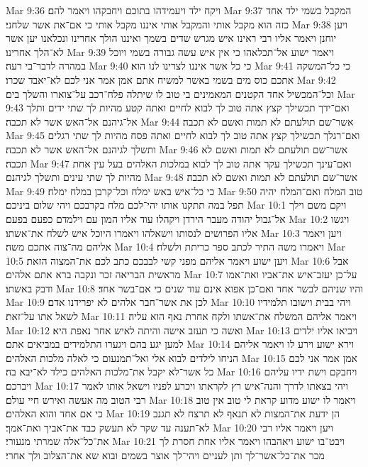 Mar 9:36  ויקח ילד ויעמידהו בתוכם ויחבקהו ויאמר להם׃
Mar 9:37  המקבל בשמי ילד אחד כזה הוא מקבל אותי והמקבל אותי איננו מקבל אותי כי אם־את אשר שלחני׃
Mar 9:38  ויען יוחנן ויאמר אליו רבי ראינו איש מגרש שדים בשמך ואיננו הולך אחרינו ונכלאנו יען אשר לא־הלך אחרינו׃
Mar 9:39  ויאמר ישוע אל־תכלאהו כי אין איש עשה גבורה בשמי ויוכל במהרה לדבר־בי רעה׃
Mar 9:40  כי כל אשר איננו לצרינו לנו הוא׃
Mar 9:41  כי כל־המשקה אתכם כוס מים בשמי באשר למשיח אתם אמן אמר אני לכם לא־יאבד שכרו׃
Mar 9:42  וכל־המכשיל אחד הקטנים המאמינים בי טוב לו שיתלה פלח־רכב על־צוארו והשלך בים׃
Mar 9:43  ואם־ידך תכשילך קצץ אתה טוב לך לבוא לחיים ואתה קטע מהיות לך שתי ידים ותלך אל־גיהנם אל־האש אשר לא תכבה׃
Mar 9:44  אשר־שם תולעתם לא תמות ואשם לא תכבה׃
Mar 9:45  ואם־רגלך תכשילך קצץ אתה טוב לך לבוא לחיים ואתה פסח מהיות לך שתי רגלים ותשלך לגיהנם אל־האש אשר לא תכבה׃
Mar 9:46  אשר־שם תולעתם לא תמות ואשם לא תכבה׃
Mar 9:47  ואם־עינך תכשילך עקר אתה טוב לך לבוא במלכות האלהים בעל עין אחת מהיות לך שתי עינים ותשלך לגיהנם׃
Mar 9:48  אשר־שם תולעתם לא תמות ואשם לא תכבה׃
Mar 9:49  כי כל־איש באש ימלח וכל־קרבן במלח ימלח׃
Mar 9:50  טוב המלח ואם־המלח יהיה תפל במה תתקנו אותו יהי־לכם מלח בקרבכם ויהי שלום ביניכם׃
Mar 10:1  ויקם משם וילך אל־גבול יהודה מעבר הירדן ויקהלו עוד אליו המון עם וילמדם כפעם בפעם׃
Mar 10:2  ויגשו אליו הפרושים לנסותו וישאלהו ויאמרו היוכל איש לשלח את־אשתו׃
Mar 10:3  ויען ויאמר אליהם מה־צוה אתכם משה׃
Mar 10:4  ויאמרו משה התיר לכתב ספר כריתת ולשלח׃
Mar 10:5  ויען ישוע ויאמר אליהם מפני קשי לבבכם כתב לכם את־המצוה הזאת׃
Mar 10:6  אבל מראשית הבריאה זכר ונקבה ברא אתם אלהים׃
Mar 10:7  על־כן יעזב־איש את־אביו ואת־אמו ודבק באשתו׃
Mar 10:8  והיו שניהם לבשר אחד ואם־כן אפוא אינם עוד שנים כי אם־בשר אחד׃
Mar 10:9  לכן את אשר־חבר אלהים לא יפרידנו אדם׃
Mar 10:10  ויהי בבית וישובו תלמידיו לשאל אתו על־זאת׃
Mar 10:11  ויאמר אליהם המשלח את־אשתו ולקח אחרת נאף הוא עליה׃
Mar 10:12  ואשה כי תעזב אישה והיתה לאיש אחר נאפת היא׃
Mar 10:13  ויביאו אליו ילדים למען יגע בהם ויגערו התלמידים במביאים אתם׃
Mar 10:14  וירא ישוע וירע לו ויאמר אליהם הניחו לילדים לבוא אלי ואל־תמנעום כי לאלה מלכות האלהים׃
Mar 10:15  אמן אמר אני לכם כל אשר־לא יקבל את־מלכות האלהים כילד לא־יבא בה׃
Mar 10:16  ויחבקם וישת ידיו עליהם ויברכם׃
Mar 10:17  ויהי בצאתו לדרך והנה־איש רץ לקראתו ויכרע לפניו וישאל אותו לאמר רבי הטוב מה אעשה ואירש חיי עולם׃
Mar 10:18  ויאמר לו ישוע מדוע קראת לי טוב אין טוב כי אם אחד והוא האלהים׃
Mar 10:19  הן ידעת את־המצות לא תנאף לא תרצח לא תגנב לא־תענה עד שקר לא תעשק כבד את־אביך ואת־אמך׃
Mar 10:20  ויען ויאמר אליו רבי את־כל־אלה שמרתי מנעורי׃
Mar 10:21  ויבט־בו ישוע ויאהבהו ויאמר אליו אחת חסרת לך מכר את־כל־אשר־לך ותן לעניים ויהי־לך אוצר בשמים ובוא שא את־הצלוב ולך אחרי׃
